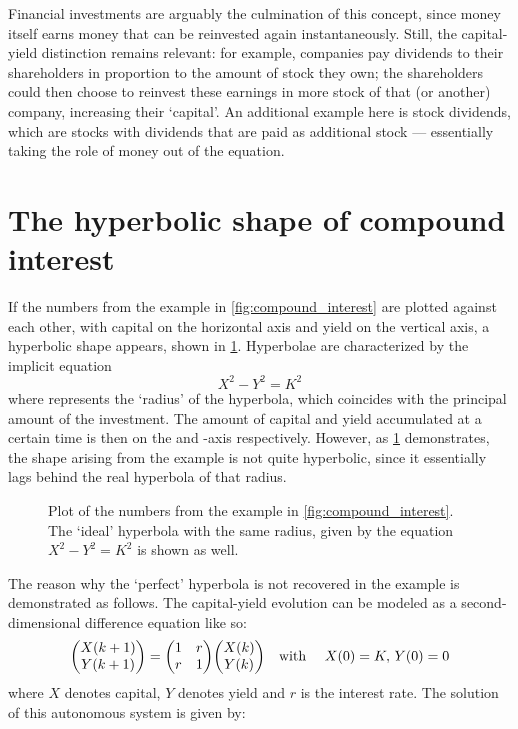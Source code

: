Financial investments are arguably the culmination of this concept, since money itself earns money that can be reinvested again instantaneously. Still, the capital-yield distinction remains relevant: for example, companies pay dividends to their shareholders in proportion to the amount of stock they own; the shareholders could then choose to reinvest these earnings in more stock of that (or another) company, increasing their `capital'. An additional example here is stock dividends, which are stocks with dividends that are paid as additional stock --- essentially taking the role of money out of the equation.

\section{The hyperbolic shape of compound interest}
If the numbers from the example in \cref{fig:compound_interest} are plotted against each other, with capital on the horizontal axis and yield on the vertical axis, a hyperbolic shape appears, shown in \cref{fig:hyperbolic_compounding}. Hyperbolae are characterized by the implicit equation 
\begin{equation}
    X^2 - Y^2 = K^2
    \label{eq:hyperbola}
\end{equation}
where  represents the `radius' of the hyperbola, which coincides with the principal amount of the investment. The amount of capital and yield accumulated at a certain time is then on the  and -axis respectively. However, as \cref{fig:hyperbolic_compounding} demonstrates, the shape arising from the example is not quite hyperbolic, since it essentially lags behind the real hyperbola of that radius.
\begin{figure}[h!]
    \centering
    
    \caption{Plot of the numbers from the example in \cref{fig:compound_interest}. The `ideal' hyperbola with the same radius, given by the equation $X^2 - Y^2 = K^2$ is shown as well.}
    \label{fig:hyperbolic_compounding}
\end{figure}
The reason why the `perfect' hyperbola is not recovered in the example is demonstrated as follows. The capital-yield evolution can be modeled as a second-dimensional difference equation like so:
$$ \mqty(X(k+1)\\Y(k+1)) = \mqty(1& r \\ r & 1)\mqty(X(k)\\Y(k))\qq{with }X(0) = K,\, Y(0) = 0 $$
where $X$ denotes capital, $Y$ denotes yield and $r$ is the interest rate. The solution of this autonomous system is given by:
